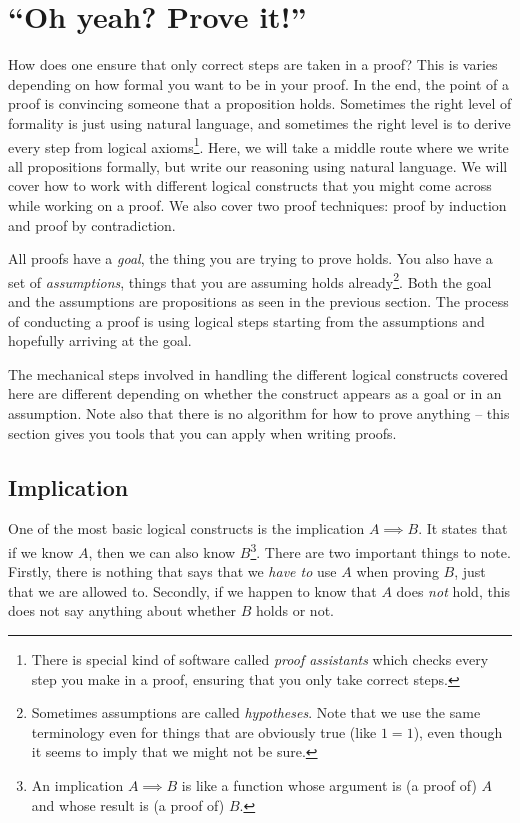 \documentclass{tufte-handout}
\begin{document}
\section{``Oh yeah? Prove it!''}

How does one ensure that only correct steps are taken in a proof?
This is varies depending on how formal you want to be in your
proof. In the end, the point of a proof is convincing someone that
a proposition holds. Sometimes the right level of formality is
just using natural language, and sometimes the right level is to
derive every step from logical axioms\footnote{There is special
  kind of software called \emph{proof assistants} which checks
  every step you make in a proof, ensuring that you only take
  correct steps.}.
%
Here, we will take a middle route where we write all propositions
formally, but write our reasoning using natural language.
%
We will cover how to work with different logical constructs that
you might come across while working on a proof. We also cover two
proof techniques: proof by induction and proof by contradiction.

All proofs have a \emph{goal}, the thing you are trying to prove
holds. You also have a set of \emph{assumptions}, things that you
are assuming holds already\footnote{Sometimes assumptions are
  called \emph{hypotheses}. Note that we use the same terminology
  even for things that are obviously true (like $1=1$), even
  though it seems to imply that we might not be sure.}. Both the
goal and the assumptions are propositions as seen in the previous
section. The process of conducting a proof is using logical steps
starting from the assumptions and hopefully arriving at the goal.

The mechanical steps involved in handling the different logical
constructs covered here are different depending on whether the
construct appears as a goal or in an assumption. Note also that
there is no algorithm for how to prove anything -- this section
gives you tools that you can apply when writing proofs.


\subsection{Implication}

One of the most basic logical constructs is the implication
$A \!\!\implies\!\! B$. It states that if we know $A$, then we can also
know $B$\footnote{An implication $A \implies B$ is like a function
  whose argument is (a proof of) $A$ and whose result is (a proof
  of) $B$.}. There are two important things to note. Firstly,
there is nothing that says that we \emph{have to} use $A$ when
proving $B$, just that we are allowed to. Secondly, if we happen
to know that $A$ does \emph{not} hold, this does not say anything
about whether $B$ holds or not.
\end{document}
